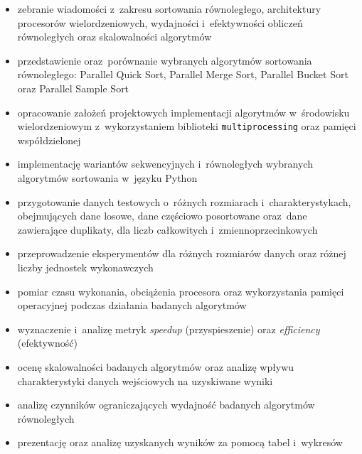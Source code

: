 \begin{itemize}

\item zebranie wiadomości z~zakresu sortowania równoległego, architektury procesorów wielordzeniowych,
wydajności i~efektywności obliczeń równoległych oraz skalowalności algorytmów

\item przedstawienie oraz~porównanie wybranych algorytmów sortowania równoległego: 
Parallel Quick Sort, Parallel Merge Sort, Parallel Bucket Sort oraz Parallel Sample Sort

\item opracowanie założeń projektowych implementacji algorytmów w~środowisku wielordzeniowym
z~wykorzystaniem biblioteki \texttt{multiprocessing} oraz pamięci współdzielonej

\item implementację wariantów sekwencyjnych i~równoległych wybranych algorytmów sortowania
w~języku Python

\item przygotowanie danych testowych o~różnych rozmiarach i~charakterystykach, obejmujących dane losowe,
dane częściowo posortowane oraz~dane zawierające duplikaty, dla liczb całkowitych i~zmiennoprzecinkowych

\item przeprowadzenie eksperymentów dla różnych rozmiarów danych oraz różnej liczby jednostek wykonawczych

\item pomiar czasu wykonania, obciążenia procesora oraz wykorzystania pamięci operacyjnej podczas działania
badanych algorytmów

\item wyznaczenie i~analizę metryk \textit{speedup} (przyspieszenie) oraz \textit{efficiency} (efektywność)

\item ocenę skalowalności badanych algorytmów oraz analizę wpływu charakterystyki danych wejściowych
na uzyskiwane wyniki

\item analizę czynników ograniczających wydajność badanych algorytmów równoległych

\item prezentację oraz analizę uzyskanych wyników za pomocą tabel i~wykresów

\end{itemize}

